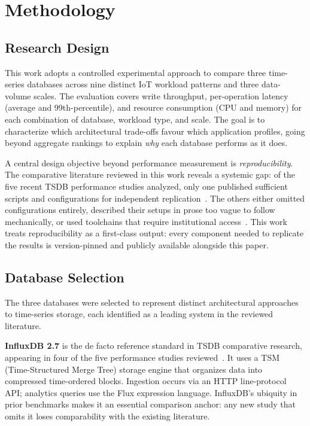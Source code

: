 \section{Methodology}
\label{sec:methodology}

\subsection{Research Design}

This work adopts a controlled experimental approach to compare three time-series databases
across nine distinct IoT workload patterns and three data-volume scales. The evaluation covers
write throughput, per-operation latency (average and 99th-percentile), and resource consumption
(CPU and memory) for each combination of database, workload type, and scale. The goal is to
characterize which architectural trade-offs favour which application profiles, going beyond
aggregate rankings to explain \textit{why} each database performs as it does.

A central design objective beyond performance measurement is \textit{reproducibility}.
The comparative literature reviewed in this work reveals a systemic gap: of the five recent
TSDB performance studies analyzed, only one published sufficient scripts and configurations
for independent replication~\cite{pereira2023mulletbench}. The others either omitted
configurations entirely, described their setups in prose too vague to follow mechanically,
or used toolchains that require institutional access~\cite{shah2022performance,naqvi2017influxdb,
lima2024avaliando,wang2023iotdb}. This work treats reproducibility as a first-class output:
every component needed to replicate the results is version-pinned and publicly available
alongside this paper.

\subsection{Database Selection}

The three databases were selected to represent distinct architectural approaches to
time-series storage, each identified as a leading system in the reviewed literature.

\textbf{InfluxDB 2.7} is the de facto reference standard in TSDB comparative research,
appearing in four of the five performance studies reviewed~\cite{naqvi2017influxdb,
shah2022performance,lima2024avaliando,wang2023iotdb}. It uses a TSM (Time-Structured Merge
Tree) storage engine that organizes data into compressed time-ordered blocks. Ingestion
occurs via an HTTP line-protocol API; analytics queries use the Flux expression language.
InfluxDB's ubiquity in prior benchmarks makes it an essential comparison anchor: any new
study that omits it loses comparability with the existing literature.

